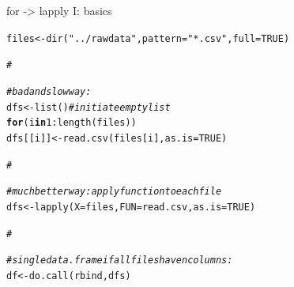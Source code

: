 \documentclass[xcolor=table,       handout,    xcolor=dvipsnames]{beamer}\usepackage[]{graphicx}\usepackage[]{color}
\makeatletter
\newcommand{\hlnum}[1]{\textcolor[rgb]{0,0,0}{#1}}
\newcommand{\hlstr}[1]{\textcolor[rgb]{0.545,0.137,0.137}{#1}}
\newcommand{\hlcom}[1]{\textcolor[rgb]{0,0.392,0}{\textit{#1}}}
\newcommand{\hlopt}[1]{\textcolor[rgb]{0,0,0}{#1}}
\newcommand{\hlstd}[1]{\textcolor[rgb]{0,0,0}{#1}}
\newcommand{\hlkwa}[1]{\textcolor[rgb]{1,0,0}{\textbf{#1}}}
\newcommand{\hlkwb}[1]{\textcolor[rgb]{0,0,0}{#1}}
\newcommand{\hlkwc}[1]{\textcolor[rgb]{1,0,1}{#1}}
\newcommand{\hlkwd}[1]{\textcolor[rgb]{0,0,1}{#1}}
\newenvironment{kframe}{%
 \def\at@end@of@kframe{}%
 \ifinner\ifhmode%
  \def\at@end@of@kframe{\end{minipage}}%
  \begin{minipage}{\columnwidth}%
 \fi\fi%
 \def\FrameCommand##1{\hskip\@totalleftmargin \hskip-\fboxsep
 \colorbox{shadecolor}{##1}\hskip-\fboxsep
     \hskip-\linewidth \hskip-\@totalleftmargin \hskip\columnwidth}%
 \MakeFramed {\advance\hsize-\width
   \@totalleftmargin\z@ \linewidth\hsize
   \@setminipage}}%
 {\par\unskip\endMakeFramed%
 \at@end@of@kframe}
\newenvironment{knitrout}{}{} %
\makeatother
\begin{document}
\begin{frame}[fragile]{for -> lapply I: basics}
\vspace{-1em}
\begin{knitrout}
\color{fgcolor}\begin{kframe}
\begin{alltt}
\hlstd{files} \hlkwb{<-} \hlkwd{dir}\hlstd{(}\hlstr{"../rawdata"}\hlstd{,} \hlkwc{pattern}\hlstd{=}\hlstr{"*.csv"}\hlstd{,} \hlkwc{full}\hlstd{=}\hlnum{TRUE}\hlstd{)}

\hlcom{#}
\end{alltt}
\end{kframe}
\end{knitrout}
\pause \vspace{-2.7em}
\begin{knitrout}
\color{fgcolor}\begin{kframe}
\begin{alltt}
\hlcom{# bad and slow way:}
\hlstd{dfs} \hlkwb{<-} \hlkwd{list}\hlstd{()} \hlcom{# initiate empty list}
\hlkwa{for}\hlstd{(i} \hlkwa{in} \hlnum{1}\hlopt{:}\hlkwd{length}\hlstd{(files))}
   \hlstd{dfs[[i]]} \hlkwb{<-} \hlkwd{read.csv}\hlstd{(files[i],} \hlkwc{as.is}\hlstd{=}\hlnum{TRUE}\hlstd{)}

\hlcom{#}
\end{alltt}
\end{kframe}
\end{knitrout}
\pause \vspace{-2.7em}
\begin{knitrout}
\color{fgcolor}\begin{kframe}
\begin{alltt}
\hlcom{# much better way: apply function to each file}
\hlstd{dfs} \hlkwb{<-} \hlkwd{lapply}\hlstd{(}\hlkwc{X}\hlstd{=files,} \hlkwc{FUN}\hlstd{=read.csv,} \hlkwc{as.is}\hlstd{=}\hlnum{TRUE}\hlstd{)}

\hlcom{#}
\end{alltt}
\end{kframe}
\end{knitrout}
\pause \vspace{-2.7em}
\begin{knitrout}
\color{fgcolor}\begin{kframe}
\begin{alltt}
\hlcom{# single data.frame if all files have n columns:}
\hlstd{df} \hlkwb{<-} \hlkwd{do.call}\hlstd{(rbind, dfs)}


\end{alltt}
\end{kframe}
\end{knitrout}
\end{frame}
\end{document}

